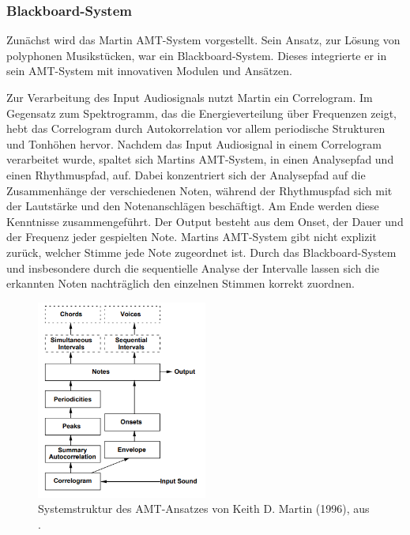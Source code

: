\subsubsection{Blackboard-System}
Zunächst wird das Martin AMT-System \cite{Martin1996} vorgestellt.
Sein Ansatz, zur Lösung von polyphonen Musikstücken, war ein Blackboard-System.
Dieses integrierte er in sein AMT-System mit innovativen Modulen und Ansätzen.

Zur Verarbeitung des Input Audiosignals nutzt Martin ein Correlogram.
Im Gegensatz zum Spektrogramm, das die Energieverteilung über Frequenzen zeigt,
hebt das Correlogram durch Autokorrelation vor allem periodische Strukturen und Tonhöhen hervor.
Nachdem das Input Audiosignal in einem Correlogram verarbeitet wurde,
spaltet sich Martins AMT-System, in einen Analysepfad und einen Rhythmuspfad, auf.
Dabei konzentriert sich der Analysepfad auf die Zusammenhänge der verschiedenen Noten,
während der Rhythmuspfad sich mit der Lautstärke und den Notenanschlägen beschäftigt.
Am Ende werden diese Kenntnisse zusammengeführt.
Der Output besteht aus dem Onset, der Dauer und der Frequenz jeder gespielten Note.
Martins AMT-System gibt nicht explizit zurück, welcher Stimme jede Note zugeordnet ist.
Durch das Blackboard-System und insbesondere durch die sequentielle Analyse der Intervalle
lassen sich die erkannten Noten nachträglich den einzelnen Stimmen korrekt zuordnen.

\begin{figure}[H]
    \centering
    \includegraphics[width=0.5\textwidth]{Graphics/Martin1996Structure}
    \caption[Systemstruktur nach Martin]{Systemstruktur des AMT-Ansatzes von Keith D. Martin (1996), aus  \cite{Martin1996}.}
    \label{fig:martin-structure}
\end{figure}


